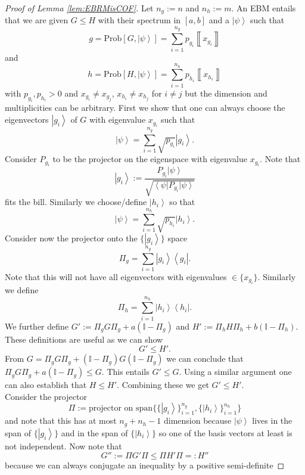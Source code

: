 \documentclass{article}
\begin{document}
\begin{proof}[Proof of Lemma \ref{lem:EBRMisCOF}]
Let $n_{g}:=n$ and $n_{h}:=m$. An EBM entails that we are given
$G\le H$ with their spectrum in $[a,b]$ and a $\left|\psi\right\rangle $
such that 
\[
g=\text{Prob}[G,\left|\psi\right\rangle ]=\sum_{i=1}^{n_{g}}p_{g_{i}}\left\llbracket x_{g_{i}}\right\rrbracket 
\]
 and 
\[
h=\text{Prob}[H,\left|\psi\right\rangle ]=\sum_{i=1}^{n_{h}}p_{h_{i}}\left\llbracket x_{h_{i}}\right\rrbracket 
\]
with $p_{g_{i}},p_{h_{i}}>0$ and $x_{g_{i}}\neq x_{g_{j}}$, $x_{h_{i}}\neq x_{h_{j}}$
for $i\neq j$ but the dimension and multiplicities can be arbitrary.
First we show that one can always choose the eigenvectors $\left|g_{i}\right\rangle $
of $G$ with eigenvalue $x_{g_{i}}$ such that 
\[
\left|\psi\right\rangle =\sum_{i=1}^{n_{g}}\sqrt{p_{g_{i}}}\left|g_{i}\right\rangle .
\]
Consider $P_{g_{i}}$ to be the projector on the eigenspace with eigenvalue
$x_{g_{i}}$. Note that 
\[
\left|g_{i}\right\rangle :=\frac{P_{g_{i}}\left|\psi\right\rangle }{\sqrt{\left\langle \psi\right|P_{g_{i}}\left|\psi\right\rangle }}
\]
fits the bill. Similarly we choose/define $\left|h_{i}\right\rangle $
so that 
\[
\left|\psi\right\rangle =\sum_{i=1}^{n_{h}}\sqrt{p_{h_{i}}}\left|h_{i}\right\rangle .
\]
Consider now the projector onto the $\{\left|g_{i}\right\rangle \}$
space 
\[
\Pi_{g}=\sum_{i=1}^{n_{g}}\left|g_{i}\right\rangle \left\langle g_{i}\right|.
\]
Note that this will not have all eigenvectors with eigenvalues $\in\{x_{g_{i}}\}$.
Similarly we define 
\[
\Pi_{h}=\sum_{i=1}^{n_{h}}\left|h_{i}\right\rangle \left\langle h_{i}\right|.
\]
We further define $G':=\Pi_{g}G\Pi_{g}+a(\mathbb{I}-\Pi_{g})$ and
$H':=\Pi_{h}H\Pi_{h}+b(\mathbb{I}-\Pi_{h})$. These definitions are
useful as we can show 
\[
G'\le H'.
\]
From $G=\Pi_{g}G\Pi_{g}+(\mathbb{I}-\Pi_{g})G(\mathbb{I}-\Pi_{g})$
we can conclude that $\Pi_{g}G\Pi_{g}+a(\mathbb{I}-\Pi_{g})\le G$.
This entails $G'\le G$. Using a similar argument one can also establish
that $H\le H'$. Combining these we get $G'\le H'$. \\
Consider the projector 
\[
\Pi:=\text{projector on span}\{\{\left|g_{i}\right\rangle \}_{i=1}^{n_{g}},\{\left|h_{i}\right\rangle \}_{i=1}^{n_{h}}\}
\]
and note that this has at most $n_{g}+n_{h}-1$ dimension because
$\left|\psi\right\rangle $ lives in the span of $\{\left|g_{i}\right\rangle \}$
and in the span of $\{\left|h_{i}\right\rangle \}$ so one of the
basis vectors at least is not independent. Now note that 
\[
G'':=\Pi G'\Pi\le\Pi H'\Pi=:H''
\]
because we can always conjugate an inequality by a positive semi-definite

\end{proof}
\end{document}
